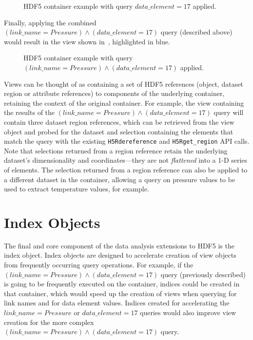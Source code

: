 \documentclass[letterpaper,hyper]{THG_RFC}
\begin{document}
\begin{figure}

\caption{HDF5 container example with query $data\_element = 17$ applied.}
\label{fig:hdf5_view3}
\end{figure}

Finally, applying the combined $(link\_name = Pressure)\land(data\_element = 17)$
query (described above) would result in the view shown in~,
highlighted in blue.

\begin{figure}

\caption{HDF5 container example with query $(link\_name = Pressure)\land(data\_element = 17)$ applied.}
\label{fig:hdf5_view4}
\end{figure}

Views can be thought of as containing a set of HDF5 references (object,
dataset region or attribute references) to components of the underlying
container, retaining the context of the original container. For example, the
view containing the results of the $(link\_name = Pressure)\land(data\_element = 17)$
query will contain three dataset region references, which
can be retrieved from the view object and probed for the dataset and selection
containing the elements that match the query with the existing \texttt{H5Rdereference}
and \texttt{H5Rget\_region} API calls. Note that selections returned from a region
reference retain the underlying dataset's dimensionality and coordinates---they
are not \textit{flattened} into a 1-D series of elements. The selection returned
from a region reference can also be applied to a different dataset in the container,
allowing a query on pressure values to be used to extract temperature values,
for example.

\section{Index Objects}
The final and core component of the data analysis extensions to HDF5 is the index object.
Index objects are designed to accelerate creation of view objects from
frequently occurring query operations.
For example, if the $(link\_name = Pressure)\land(data\_element = 17)$ query
(previously described) is going to be frequently executed on the container, indices
could be created in that container, which would speed up the creation of views
when querying for link names and for data element values. Indices created for
accelerating the $link\_name = Pressure$ or $data\_element = 17$ queries
would also improve view creation for the more complex
$(link\_name = Pressure)\land(data\_element = 17)$ query.
\end{document}
